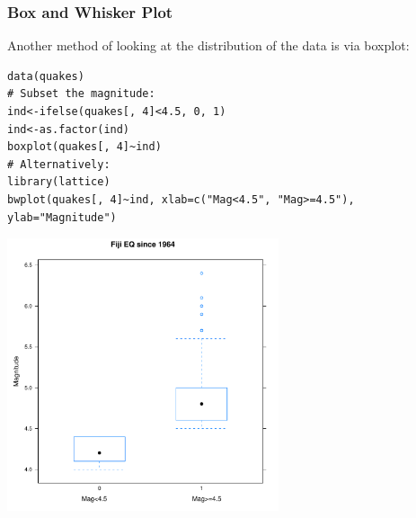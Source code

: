 \begin{frame}
\frametitle{Box and Whisker Plot}

Another method of looking at the distribution of the data is via boxplot:
  		\begin{lstlisting}
data(quakes)		
# Subset the magnitude:
ind<-ifelse(quakes[, 4]<4.5, 0, 1)
ind<-as.factor(ind)
boxplot(quakes[, 4]~ind)
# Alternatively:
library(lattice)
bwplot(quakes[, 4]~ind, xlab=c("Mag<4.5", "Mag>=4.5"), ylab="Magnitude")
		\end{lstlisting}

        \begin{center}
         \includegraphics[width=0.6\textwidth]{images/bwplot.pdf}
        \end{center}
\end{frame}

